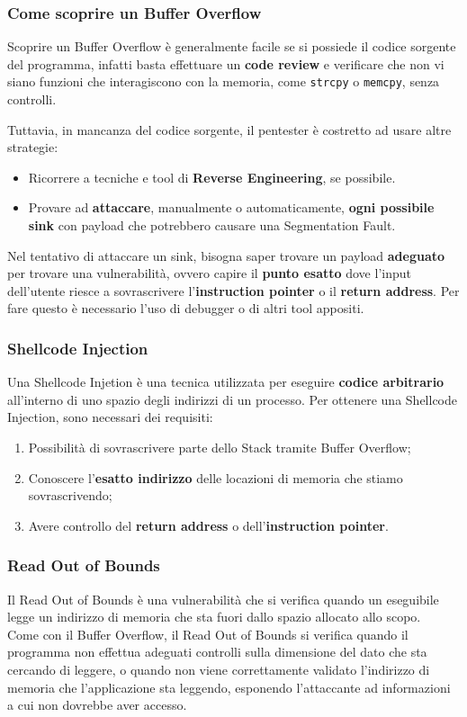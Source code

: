 \documentclass{article}
\begin{document}
\newpage

\subsubsection{Come scoprire un Buffer Overflow}
Scoprire un Buffer Overflow è generalmente facile se si possiede il codice sorgente del programma, infatti basta effettuare un \textbf{code review} e verificare che non vi siano funzioni che interagiscono con la memoria, come \verb|strcpy| o \verb|memcpy|, senza controlli.	

Tuttavia, in mancanza del codice sorgente, il pentester è costretto ad usare altre strategie:
\begin{itemize}
	\item Ricorrere a tecniche e tool di \textbf{Reverse Engineering}, se possibile.
	
	\item Provare ad \textbf{attaccare}, manualmente o automaticamente, \textbf{ogni possibile sink} con payload che potrebbero causare una
	Segmentation Fault.
\end{itemize} 

Nel tentativo di attaccare un sink, bisogna saper trovare un payload \textbf{adeguato} per trovare una vulnerabilità, ovvero capire il \textbf{punto esatto} dove l'input dell'utente riesce a sovrascrivere l'\textbf{instruction pointer} o il \textbf{return address}. Per fare questo è necessario l'uso di debugger o di altri tool appositi.

\subsubsection{Shellcode Injection}
Una Shellcode Injetion è una tecnica utilizzata per eseguire \textbf{codice arbitrario} all'interno di uno spazio degli indirizzi di un processo. Per ottenere una Shellcode Injection, sono necessari dei requisiti:
\begin{enumerate}
	\item Possibilità di sovrascrivere parte dello Stack tramite Buffer Overflow;
	\item Conoscere l’\textbf{esatto indirizzo} delle locazioni di memoria che stiamo sovrascrivendo;
	\item Avere controllo del \textbf{return address} o dell’\textbf{instruction pointer}.
\end{enumerate}

\subsubsection{Read Out of Bounds}
Il Read Out of Bounds è una vulnerabilità che si verifica quando un eseguibile legge un indirizzo di memoria che sta fuori dallo spazio allocato allo scopo.\\
Come con il Buffer Overflow, il Read Out of Bounds si verifica quando il programma non effettua adeguati controlli sulla dimensione del dato che sta cercando di leggere, o quando non viene correttamente validato l’indirizzo di memoria che l’applicazione sta leggendo, esponendo l'attaccante ad informazioni a cui non dovrebbe aver accesso.
\end{document}

